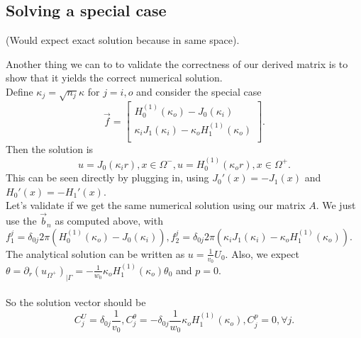 \documentclass[10pt,journal,compsoc, onecolumn]{IEEEtran}
\begin{document}
\subsection{Solving a special case}
(Would expect exact solution because in same space).


Another thing we can to to validate the correctness of our derived matrix is to show that it yields the correct numerical solution. \\
Define $\kappa_j = \sqrt{n_j} \kappa$ for $j = i, o$ and consider the special case 
$$
\vec{f} = 
\begin{bmatrix}
    H_0^{(1)}(\kappa_o ) - J_0(\kappa_i ) \\
    \kappa_i J_1(\kappa_i ) - \kappa_o H_1^{(1)}(\kappa_o ) \\
\end{bmatrix}.
$$
Then the solution is 
$$
u = J_0(\kappa_i r), x \in \Omega^-, u = H_0^{(1)}(\kappa_o r), x \in \Omega^+.
$$
This can be seen directly by plugging in, using $J_0'(x) = - J_1(x)$ and $H_0'(x) = - H_1'(x)$. \\
Let's validate if we get the same numerical solution using our matrix $A$. We just use the $\vec{b}_n$ as computed above,
with $f_1^j =  \delta_{0j} 2\pi (H_0^{(1)}(\kappa_o ) - J_0(\kappa_i )), f_2^j = \delta_{0j} 2\pi (\kappa_i J_1(\kappa_i ) - \kappa_o H_1^{(1)}(\kappa_o))$.\\
The analytical solution can be written as $u = \frac{1}{v_0} U_0$. 
Also, we expect $\theta = \partial_r(u_{\Omega^+})_{|\Gamma} = - \frac{1}{w_0} \kappa_o H_1^{(1)}(\kappa_o) \theta_0 $ and $p = 0$.\\
\\
So the solution vector should be
$$
C_j^U = \delta_{0j}  \frac{1}{v_0}, C_j^\theta = -\delta_{0j} \frac{1}{w_0} \kappa_o H_1^{(1)}(\kappa_o), C_j^p = 0, \forall j.
$$
\end{document}

